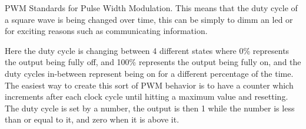PWM Standards for Pulse Width Modulation. This means that the duty cycle of a square wave is being changed over time, this can be simply to dimm an led or for exciting reasons such as communicating information.\\ 
\vspace{0.5cm}


\vspace{0.5cm}

Here the duty cycle is changing between 4 different states where 0\% represents the output being fully off, and 100\% represents the output being fully on, and the duty cycles in-between represent being on for a different percentage of the time. The easiest way to create this sort of PWM behavior is to have a counter which increments after each clock cycle until hitting a maximum value and resetting. The duty cycle is set by a number, the output is then 1 while the number is less than or equal to it, and zero when it is above it. 
